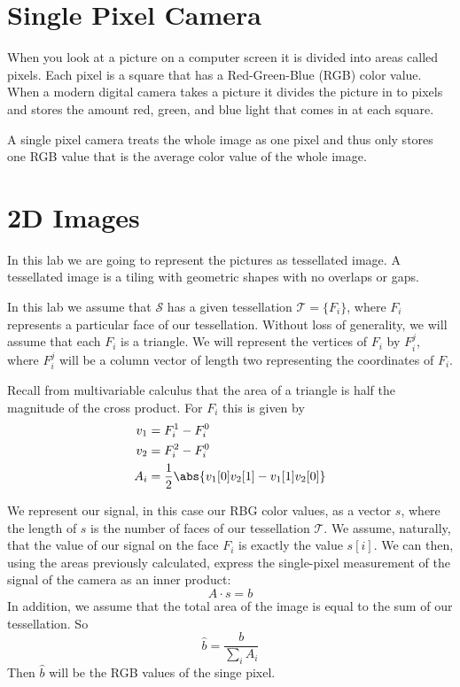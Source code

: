 \label{lab:SPC}


\section*{Single Pixel Camera}
When you look at a picture on a computer screen it is divided into areas called pixels. 
Each pixel is a square that has a Red-Green-Blue (RGB) color value. 
When a  modern digital camera takes a picture it divides the picture in to pixels and stores the amount red, green, and blue light that comes in at each square.

A single pixel camera treats the whole image as one pixel and thus only stores one RGB value that is the average color value of the whole image.  

\section*{2D Images}
In this lab we are going to represent the pictures as tessellated image.
A tessellated image is a tiling with geometric shapes with no overlaps or gaps. 

In this lab we assume that $\mathcal{S}$ has a given tessellation $\mathcal{T} = \{F_i\}$, where $F_i$ represents a particular face of our tessellation. 
Without loss of generality, we will assume that each $F_i$ is a triangle. 
We will represent the vertices of $F_i$ by $F^j_i$, where $F^j_i$ will be a column vector of length two representing the coordinates of $F_i$.

Recall from multivariable calculus that the area of a triangle is half the magnitude of the cross product. 
For $F_i$ this is given by
\begin{align}
v_1 &= F_i^1 - F_i^0 \\
v_2 &= F_i^2 - F_i^0 \\
A_i &= \frac{1}{2}\abs{v_1[0] v_2[1] - v_1[1] v_2[0]}
\end{align}


We represent our signal, in this case our RBG color values, as a vector $s$, where the length of $s$ is the number of faces of our tessellation $\mathcal{T}$. 
We assume, naturally, that the value of our signal on the face $F_i$ is exactly the value $s[i]$.
We can then, using the areas previously calculated, express the single-pixel measurement of the signal of the camera as an inner product:
\begin{equation}
A \cdot s = b
\end{equation}
In addition, we assume that the total area of the image is equal to the sum of our tessellation. 
So  
\begin{equation}
\hat{b} = \frac{b}{\sum_i A_i}
\end{equation}
Then $\hat{b}$ will be the RGB values of the singe pixel.

